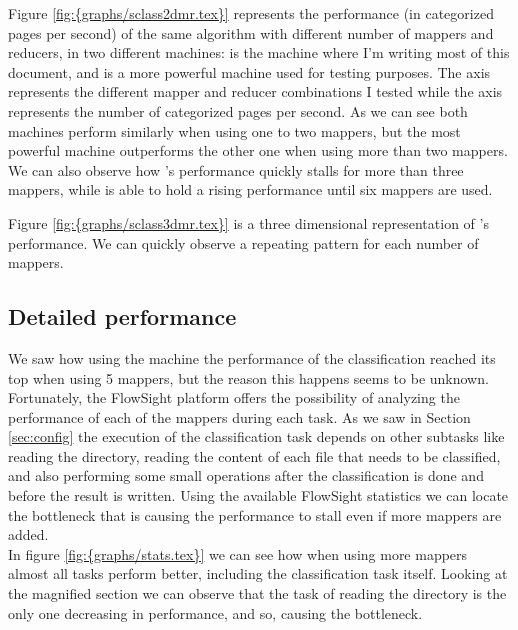 Figure \ref{fig:{graphs/sclass2dmr.tex}} represents the performance (in categorized pages per second) of the same algorithm with different number of mappers and reducers, in two different machines:  
is the machine where I'm writing most of this document, and  is a more powerful machine used for testing purposes. The  axis represents the 
different mapper and reducer combinations I tested while the  axis represents the number of categorized pages per second.
As we can see both machines perform similarly when using one to two mappers, but the most powerful machine outperforms the other one when using more than two mappers. We can also observe how 's performance
quickly stalls for more than three mappers, while  is able to hold a rising performance until six mappers are used.

Figure \ref{fig:{graphs/sclass3dmr.tex}} is a three dimensional representation of 's performance. We can quickly observe a repeating pattern for each number of mappers.

\subsection{Detailed performance}
We saw how using the  machine the performance of the classification reached its top when using 5 mappers, but the reason this happens seems to be unknown. 
Fortunately, the FlowSight platform offers the possibility of analyzing the performance of each of the mappers during each task. As we saw in Section \ref{sec:config} the execution of the classification
task depends on other subtasks like reading the directory, reading the content of each file that needs to be classified, and also performing some small operations after the classification is done and before
the result is written. Using the available FlowSight statistics we can locate the bottleneck that is causing the performance to stall even if more mappers are added. \\ 
In figure \ref{fig:{graphs/stats.tex}} we can see how when using more mappers almost all tasks perform better, including the classification task itself. Looking at the magnified section we can observe
that the task of reading the directory is the only one decreasing in performance, and so, causing the bottleneck. 


